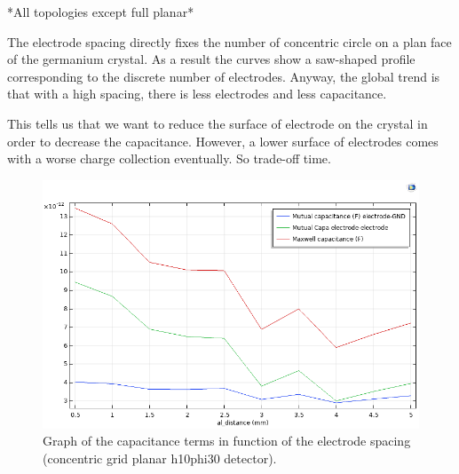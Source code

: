 *All topologies except full planar*

The electrode spacing directly fixes the number of concentric circle on a plan face of the germanium crystal. As a result the curves show a saw-shaped profile corresponding to the discrete number of electrodes.
Anyway, the global trend is that with a high spacing, there is less electrodes and less capacitance.

This tells us that we want to reduce the surface of electrode on the crystal in order to decrease the capacitance. However, a lower surface of electrodes comes with a worse charge collection eventually. So trade-off time.

\begin{figure}
\centering
\includegraphics[width=\linewidth]{Figures/Electrodes/capacitance_electrode_spacing.png}
\caption{Graph of the capacitance terms in function of the electrode spacing (concentric grid planar h10phi30 detector).}
\label{fig:capacitance-electrode-spacing}
\end{figure}

